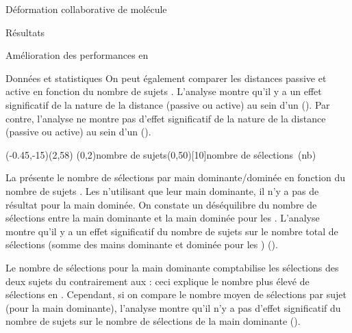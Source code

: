 \documentclass[myfrancais]{mythesis}
\begin{document}
\begin{mychapter}{Déformation collaborative de molécule}
\begin{mysection}{Résultats}
\begin{mysubsection}{Amélioration des performances en }
\begin{mysubsubsection}{Données et statistiques}
					On peut également comparer les distances passive et active en fonction du nombre de sujets .
					L'analyse montre qu'il y a un effet significatif de la nature de la distance (passive ou active) au sein d'un  ().
					Par contre, l'analyse ne montre pas d'effet significatif de la nature de la distance (passive ou active) au sein d'un  ().

					\begin{myfigure}
						\begin{myps}(-0.45,-15)(2,58)
							\myaxes(0,2){nombre de sujets}(0,50)[10]{nombre de sélections~(nb)}
						\end{myps}
					\end{myfigure}

					La  présente le nombre de sélections par main dominante/dominée  en fonction du nombre de sujets .
					Les  n'utilisant que leur main dominante, il n'y a pas de résultat pour la main dominée.
					On constate un déséquilibre du nombre de sélections entre la main dominante et la main dominée pour les .
					L'analyse montre qu'il y a un effet significatif du nombre de sujets  sur le nombre total de sélections (somme des mains dominante et dominée pour les )  ().

					Le nombre de sélections pour la main dominante comptabilise les sélections des deux sujets du  contrairement aux  : ceci explique le nombre plus élevé de sélections en .
					Cependant, si on compare le nombre moyen de sélections par sujet (pour la main dominante), l'analyse montre qu'il n'y a pas d'effet significatif du nombre de sujets  sur le nombre de sélections de la main dominante  ().


\end{mysubsubsection}
\end{mysubsection}
\end{mysection}
\end{mychapter}
\end{document}
